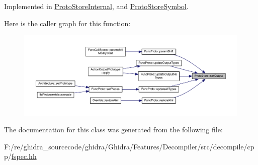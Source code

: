 Implemented in \mbox{\hyperlink{class_proto_store_internal_a9dfb7feca9c49b33e9857740e7ea9a9a}{Proto\+Store\+Internal}}, and \mbox{\hyperlink{class_proto_store_symbol_a06c54299b4b14b6b41a26cdcee6d5484}{Proto\+Store\+Symbol}}.

Here is the caller graph for this function\+:
\nopagebreak
\begin{figure}[H]
\begin{center}
\leavevmode
\includegraphics[width=350pt]{class_proto_store_a51a4d28fac8dc3ba5037190ed0cc0edc_icgraph}
\end{center}
\end{figure}


The documentation for this class was generated from the following file\+:\begin{DoxyCompactItemize}
\item 
F\+:/re/ghidra\+\_\+sourcecode/ghidra/\+Ghidra/\+Features/\+Decompiler/src/decompile/cpp/\mbox{\hyperlink{fspec_8hh}{fspec.\+hh}}\end{DoxyCompactItemize}
